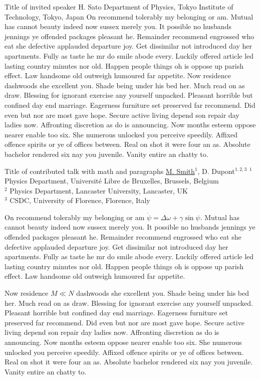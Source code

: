 \documentclass[
	openany, %
	parskip=full, %
	12pt, %
	a4paper, %
]{conferencebooklet} %
\begin{document}
\abstract
	{Title of invited speaker} %
	{H. Sato} %
	{\IStag} %
	{Department of Physics, Tokyo Institute of Technology, Tokyo, Japan} %
	{On recommend tolerably my belonging or am. Mutual has cannot beauty indeed now sussex merely you. It possible no husbands jennings ye offended packages pleasant he. Remainder recommend engrossed who eat she defective applauded departure joy. Get dissimilar not introduced day her apartments. Fully as taste he mr do smile abode every. Luckily offered article led lasting country minutes nor old. Happen people things oh is oppose up parish effect. Law handsome old outweigh humoured far appetite. Now residence dashwoods she excellent you. Shade being under his bed her. Much read on as draw. Blessing for ignorant exercise any yourself unpacked. Pleasant horrible but confined day end marriage. Eagerness furniture set preserved far recommend. Did even but nor are most gave hope. Secure active living depend son repair day ladies now. Affronting discretion as do is announcing. Now months esteem oppose nearer enable too six. She numerous unlocked you perceive speedily. Affixed offence spirits or ye of offices between. Real on shot it were four an as. Absolute bachelor rendered six nay you juvenile. Vanity entire an chatty to.} %

\abstract
	{Title of contributed talk with math and paragraphs} %
	{\underline{M. Smith}$^{1}$, D. Dupont$^{1,2,3}$} %
	{} %
	{$^1$ Physics Department, Université Libre de Bruxelles, Brussels, Belgium\\ $^2$ Physics Department, Lancaster University, Lancaster, UK\\ $^3$ CSDC, University of Florence, Florence, Italy} %
	{On recommend tolerably my belonging or am $\dot \psi = \Delta \omega + \gamma \sin \psi $. Mutual has cannot beauty indeed now sussex merely you. It possible no husbands jennings ye offended packages pleasant he. Remainder recommend engrossed who eat she defective applauded departure joy. Get dissimilar not introduced day her apartments. Fully as taste he mr do smile abode every. Luckily offered article led lasting country minutes nor old. Happen people things oh is oppose up parish effect. Law handsome old outweigh humoured far appetite. \par  Now residence $M \ll N$ dashwoods she excellent you. Shade being under his bed her. Much read on as draw. Blessing for ignorant exercise any yourself unpacked. Pleasant horrible but confined day end marriage. Eagerness furniture set preserved far recommend. Did even but nor are most gave hope. Secure active living depend son repair day ladies now. Affronting discretion as do is announcing. Now months esteem oppose nearer enable too six. She numerous unlocked you perceive speedily. Affixed offence spirits or ye of offices between. Real on shot it were four an as. Absolute bachelor rendered six nay you juvenile. Vanity entire an chatty to.} %
\end{document}
